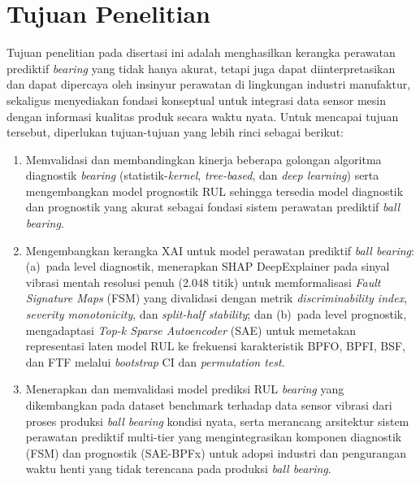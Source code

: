 \section{Tujuan Penelitian}
\label{sec:bab1_tujuan}

Tujuan penelitian pada disertasi ini adalah menghasilkan kerangka perawatan prediktif
\emph{bearing} yang tidak hanya akurat, tetapi juga dapat diinterpretasikan dan dapat dipercaya oleh insinyur perawatan di lingkungan industri
manufaktur{\color{blue}, sekaligus menyediakan fondasi konseptual untuk
integrasi data sensor mesin dengan informasi kualitas produk secara waktu nyata}.
Untuk mencapai tujuan tersebut, diperlukan tujuan-tujuan yang lebih rinci
sebagai berikut:

\begin{enumerate}

  \item {\color{blue}Memvalidasi dan membandingkan kinerja beberapa golongan
        algoritma diagnostik \emph{bearing} (statistik-\emph{kernel},
        \emph{tree-based}, dan \emph{deep learning}) serta mengembangkan model prognostik RUL
        sehingga tersedia model diagnostik dan prognostik yang akurat
        sebagai fondasi sistem perawatan prediktif \emph{ball bearing}.}

  \item {\color{blue}Mengembangkan kerangka XAI untuk model
        perawatan prediktif \emph{ball bearing}: (a)~pada level diagnostik,
        menerapkan SHAP DeepExplainer pada sinyal vibrasi mentah resolusi
        penuh (2.048 titik) untuk memformalisasi \emph{Fault Signature Maps}
        (FSM) yang divalidasi dengan metrik \emph{discriminability index},
        \emph{severity monotonicity}, dan \emph{split-half stability}; dan
        (b)~pada level prognostik, mengadaptasi \emph{Top-k Sparse
        Autoencoder} (SAE) untuk memetakan representasi laten model RUL ke
        frekuensi karakteristik BPFO, BPFI, BSF, dan FTF melalui
        \emph{bootstrap} CI dan \emph{permutation test}.}

  \item {\color{blue}Menerapkan dan memvalidasi model prediksi RUL
        \emph{bearing} yang dikembangkan pada dataset benchmark terhadap data
        sensor vibrasi dari proses produksi \emph{ball bearing} kondisi nyata,
        serta merancang arsitektur sistem perawatan
        prediktif multi-tier yang mengintegrasikan komponen diagnostik (FSM) dan prognostik
        (SAE-BPFx) untuk adopsi industri dan pengurangan waktu henti
        yang tidak terencana pada produksi \emph{ball bearing}.}

\end{enumerate}


